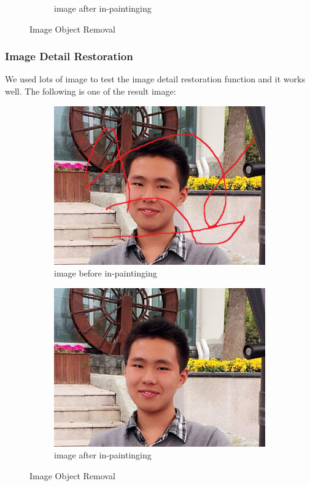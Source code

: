 \begin{figure}[H]
\begin{subfigure}[pos]{.5\textwidth}
		\caption{image after in-paintinging}
	\end{subfigure}%
	\caption{Image Object Removal}
\end{figure}
\subsubsection*{Image Detail Restoration}
\qquad We used lots of image to test the image detail restoration function and it works well. The following is one of the result image:
\begin{figure}[H]
	\begin{subfigure}[pos]{.5\textwidth}
		\centering
		\includegraphics*[width=0.8\linewidth]{zouyikai.png}
		\caption{image before in-paintinging}
	\end{subfigure}%
	\begin{subfigure}[pos]{.5\textwidth}
		\centering
		\includegraphics*[width=0.8\linewidth]{zouyikai_result.png}
		\caption{image after in-paintinging}
	\end{subfigure}%
	\caption{Image Object Removal}
\end{figure}

